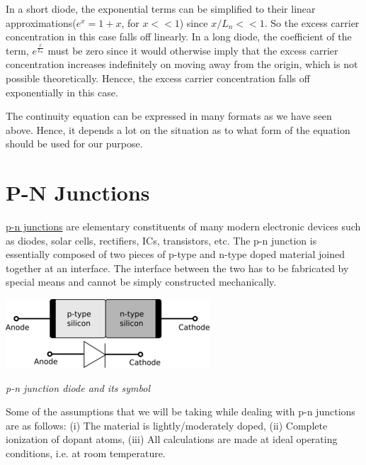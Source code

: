 \documentclass[12 pt]{article}
\begin{document}
In a short diode, the exponential terms can be simplified to their linear approximations($e^{x} = 1+x$, for $x<<1$) since $x/L_{n}<<1$. So the excess carrier concentration in this case falls off linearly. In a long diode, the coefficient of the term, $e^{\frac{x}{L_{n}}}$ must be zero since it would otherwise imply that the excess carrier concentration increases indefinitely on moving away from the origin, which is not possible theoretically. Hencce, the excess carrier concentration falls off exponentially in this case.

The continuity equation can be expressed in many formats as we have seen above. Hence, it depends a lot on the situation as to what form of the equation should be used for our purpose.

\section{P-N Junctions}

\href{https://en.wikipedia.org/wiki/P%E2%80%93n_junction}{p-n junctions} are elementary constituents of many modern electronic devices such as diodes, solar cells, rectifiers, ICs, transistors, etc. The p-n junction is essentially composed of two pieces of p-type and n-type doped material joined together at an interface. The interface between the two has to be fabricated by special means and cannot be simply constructed mechanically. \newline

 \par
  \begin{center}
   \includegraphics{1920px-PN_diode_with_electrical_symbol.svg_15.png}
   \end{center}
   \begin{center}
       \emph{\hspace{2cm}p-n junction diode and its symbol \newline}
   \end{center}
\par 

Some of the assumptions that we will be taking while dealing with p-n junctions are as follows:
(i) The material is lightly/moderately doped, (ii) Complete ionization of dopant atoms, (iii) All calculations are made at ideal operating conditions, i.e. at room temperature. \par
\end{document}
